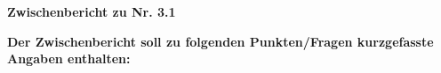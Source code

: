 \documentclass[10pt, a4paper]{article}
\begin{document}
\begin{center}
      \Large{\textbf{Zwischenbericht zu Nr. 3.1}}\\
\end{center}



\noindent\textbf{\normalsize Der Zwischenbericht soll zu folgenden Punkten/Fragen kurzgefasste Angaben enthalten:} \\ 







\end{document}
